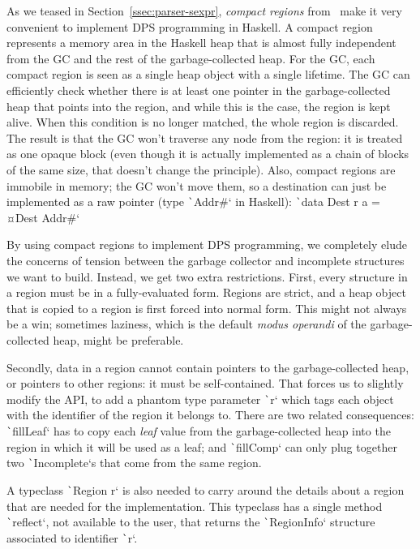\documentclass[english]{jflart}
\begin{document}
As we teased in Section~\ref{ssec:parser-sexpr}, \emph{compact regions} from~\cite{yang_efficient_2015} make it very convenient to implement DPS programming in 
Haskell. A compact region represents a memory area in the Haskell heap that is almost fully independent from the GC and the rest of the garbage-collected heap. For the GC, each compact region is seen as a single heap object with a single lifetime. The GC can efficiently check whether there is at least one pointer in the garbage-collected heap that points into the region, and while this is the case, the region is kept alive. When this condition is no longer matched, the whole region is discarded. The result is that the GC won't traverse any node from the region: it is treated as one opaque block (even though it is actually implemented as a chain of blocks of the same size, that doesn't change the principle). Also, compact regions are immobile in memory; the GC won't move them, so a destination can just be implemented as a raw pointer (type \texttt`Addr#` in Haskell): \texttt`data Dest r a = ¤Dest Addr#`

By using compact regions to implement DPS programming, we completely elude the concerns of tension between the garbage collector and incomplete structures we want to build. Instead, we get two extra restrictions. First, every structure in a region must be in a fully-evaluated form. Regions are strict, and a heap object that is copied to a region is first forced into normal form. This might not always be a win; sometimes laziness, which is the default \emph{modus operandi} of the garbage-collected heap, might be preferable.

Secondly, data in a region cannot contain pointers to the garbage-collected heap, or pointers to other regions: it must be self-contained. That forces us to slightly modify the API, to add a phantom type parameter \texttt`r` which tags each object with the identifier of the region it belongs to. There are two related consequences: \texttt`fillLeaf` has to copy each \emph{leaf} value from the garbage-collected heap into the region in which it will be used as a leaf; and \texttt`fillComp` can only plug together two \texttt`Incomplete`s that come from the same region.

A typeclass \texttt`Region r` is also needed to carry around the details about a region that are needed for the implementation. This typeclass has a single method \texttt`reflect`, not available to the user, that returns the \texttt`RegionInfo` structure associated to identifier \texttt`r`.
\end{document}
